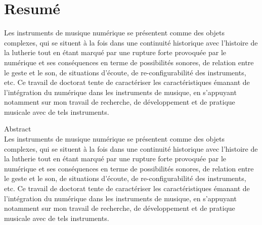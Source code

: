 %
\chapter*{Resumé}
\label{sec:abstract}
\vspace*{-10mm}

Les instruments de musique numérique se présentent comme des objets complexes, qui se situent à la fois dans une continuité historique avec l'histoire de la lutherie tout en étant marqué par une rupture forte provoquée par le numérique et ses conséquences en terme de possibilités sonores, de relation entre le geste et le son, de situations d'écoute, de re-configurabilité des instruments, etc. Ce travail de doctorat tente de caractériser les caractéristiques émanant de l'intégration du numérique dans les instruments de musique, en s'appuyant notamment sur mon travail de recherche, de développement et de pratique musicale avec de tels instruments.

\vspace*{20mm}

{Abstract}\label{sec:abstract-diff} \\

Les instruments de musique numérique se présentent comme des objets complexes, qui se situent à la fois dans une continuité historique avec l'histoire de la lutherie tout en étant marqué par une rupture forte provoquée par le numérique et ses conséquences en terme de possibilités sonores, de relation entre le geste et le son, de situations d'écoute, de re-configurabilité des instruments, etc. Ce travail de doctorat tente de caractériser les caractéristiques émanant de l'intégration du numérique dans les instruments de musique, en s'appuyant notamment sur mon travail de recherche, de développement et de pratique musicale avec de tels instruments.